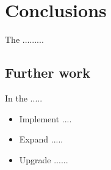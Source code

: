 \chapter{Conclusions}
The .........

\section{Further work}
In the .....
\begin{itemize}
    \item Implement ....
    \item Expand .....
    \item Upgrade ......
\end{itemize}

